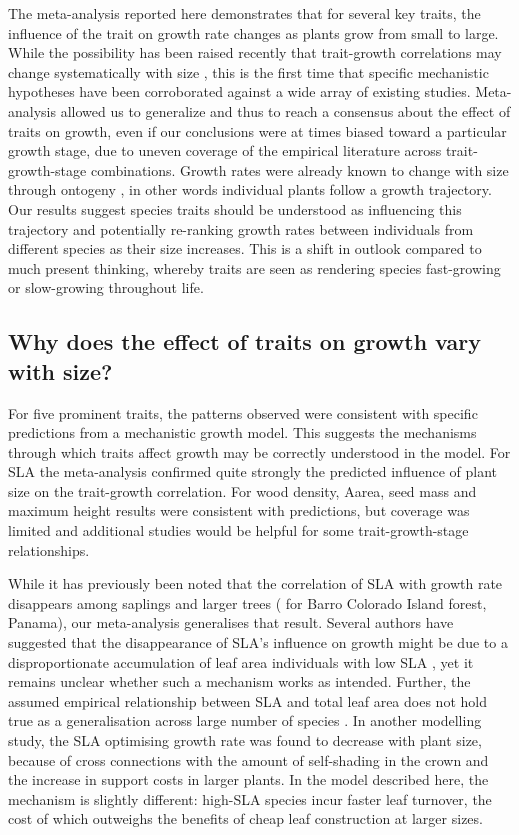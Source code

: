 \documentclass[a4paper,11pt]{article}
\begin{document}
The meta-analysis reported here demonstrates that for several key traits, the influence of the trait on growth rate changes as plants grow from small to large. While the possibility has been raised recently that trait-growth correlations may change systematically with size \citep{Falster:2011ii, Ruger:2012jv, Iida:2014ep, Iida:2014hq}, this is the first time that specific mechanistic hypotheses have been corroborated against a wide array of existing studies. Meta-analysis allowed us to generalize and thus to reach a consensus about the effect of traits on growth, even if our conclusions were at times biased toward a particular growth stage, due to uneven coverage of the empirical literature across trait-growth-stage combinations. Growth rates were already known to change with size through ontogeny \citep{Condit:1993hd, Clark:1999ed, Herault:2011dd}, in other words individual plants follow a growth trajectory. Our results suggest species traits should be understood as influencing this trajectory and potentially re-ranking growth rates between individuals from different species as their size increases. This is a shift in outlook compared to much present thinking, whereby traits are seen as rendering species fast-growing or slow-growing throughout life.

\subsection*{Why does the effect of traits on growth vary with size?}

For five prominent traits, the patterns observed were consistent with specific predictions from a mechanistic growth model. This suggests the mechanisms through which traits affect growth may be correctly understood in the model. For SLA the meta-analysis confirmed quite strongly the predicted influence of plant size on the trait-growth correlation. For wood density, Aarea, seed mass and maximum height results were consistent with predictions, but coverage was limited and additional studies would be helpful for some trait-growth-stage relationships.

While it has previously been noted that the correlation of SLA with growth rate disappears among saplings and larger trees (\citealt{Wright:2010tp} for Barro Colorado Island forest, Panama), our meta-analysis generalises that result. Several authors have suggested that the disappearance of SLA's influence on growth might be due to a disproportionate accumulation of leaf area individuals with low SLA \citep{Reich:1992wm, Poorter:2008iu,Wright:2010tp}, yet it remains unclear whether such a mechanism works as intended. Further, the assumed empirical relationship between SLA and total leaf area does not hold true as a generalisation across large number of species \citep{Duursma-2015}. In another modelling study, the SLA optimising growth rate was found to decrease with plant size, because of cross connections with the amount of self-shading in the crown and the increase in support costs in larger plants. In the model described here, the mechanism is slightly different: high-SLA species incur faster leaf turnover, the cost of which outweighs the benefits of cheap leaf construction at larger sizes.
\end{document}
